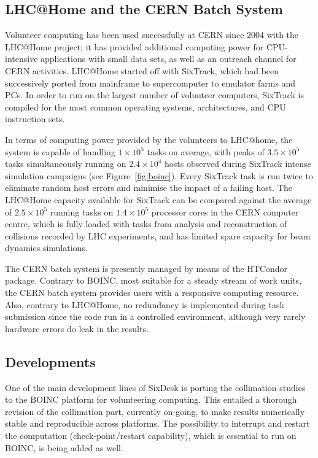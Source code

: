 \documentclass[a4paper,
              ]{jacow}
\begin{document}
\subsection{LHC@Home and the CERN Batch System}

Volunteer computing has been used successfully at CERN since 2004 with the LHC@Home project; it has provided additional computing power for CPU-intensive applications with small data sets, as well as an outreach channel for CERN activities. LHC@Home started off with SixTrack, which had been successively ported from mainframe to supercomputer to emulator farms and PCs. In order to run on the largest number of volunteer computers, SixTrack is compiled for the most common operating systems, architectures, and CPU instruction sets.

In terms of computing power provided by the volunteers to LHC@home, the system is capable of handling $1\times 10^5$ tasks on average, with peaks of $3.5 \times 10^5$ tasks simultaneously running on $2.4 \times 10^4$ hosts observed during SixTrack intense simulation campaigns (see Figure~\ref{fig:boinc}). Every SixTrack task is run twice to eliminate random host errors and minimise the impact of a failing host. The LHC@Home capacity available for SixTrack can be compared against the average of $2.5 \times 10^5$ running tasks on $1.4 \times 10^5$ processor cores in the CERN computer centre, which is fully loaded with tasks from analysis and reconstruction of collisions recorded by LHC experiments, and has limited spare capacity for beam dynamics simulations.

The CERN batch system is presently managed by means of the HTCondor~\cite{HTCondor} package. Contrary to BOINC, most suitable for a steady stream of work units, the CERN batch system provides users with a responsive computing resource. Also, contrary to LHC@Home, no redundancy is implemented during task submission since the code run in a controlled environment, although very rarely hardware errors do leak in the results.

\subsection{Developments}

One of the main development lines of SixDesk is porting the collimation studies to the BOINC platform for volunteering computing. This entailed a thorough revision of the collimation part, currently on-going, to make results numerically stable and reproducible across platforms. The possibility to interrupt and restart the computation (check-point/restart capability), which is essential to run on BOINC,  is being added as well.
\end{document}

